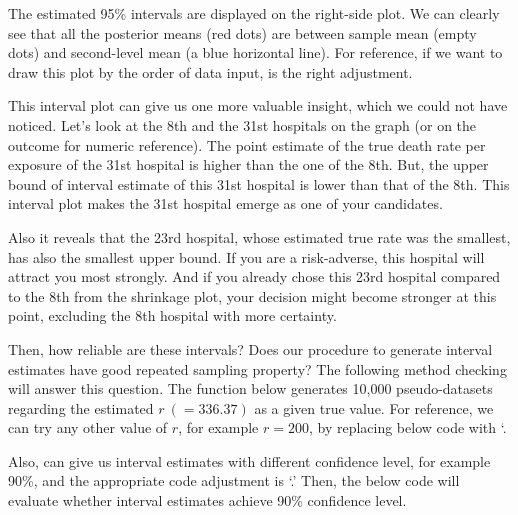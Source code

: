 \documentclass[article]{jss}
\begin{document}
The estimated 95\% intervals are displayed on the right-side plot. We can clearly see that all the posterior means (red dots) are between sample mean (empty dots) and second-level mean (a blue horizontal line). For reference, if we want to draw this plot by the order of data input,  is the right adjustment. 


This interval plot can give us one more valuable insight, which we could not have noticed. Let's look at the 8th and the 31st hospitals on the graph (or on the outcome for numeric reference). The point estimate of the true death rate per exposure of the 31st hospital is higher than the one of the 8th. But, the upper bound of interval estimate of this 31st hospital is lower than that of the 8th. This interval plot makes the 31st hospital emerge as one of your candidates.


Also it reveals that the 23rd hospital, whose estimated true rate was the smallest, has also the smallest upper bound. If you are a risk-adverse, this hospital will attract you most strongly. And if you already chose this 23rd hospital compared to the 8th from the shrinkage plot, your decision might become stronger at this point, excluding the 8th hospital with more certainty. 


Then, how reliable are these intervals? Does our procedure to generate interval estimates have good repeated sampling property? The following method checking will answer this question. The  function below generates 10,000 pseudo-datasets regarding the estimated $r~(=336.37)$ as a given true value. For reference, we can try any other value of $r$, for example $r=200$, by replacing below code with `.


Also,  can give us interval estimates with different confidence level, for example 90\%,  and the appropriate code adjustment is `.'  Then, the below code will evaluate whether interval estimates achieve 90\% confidence level.
\end{document}
